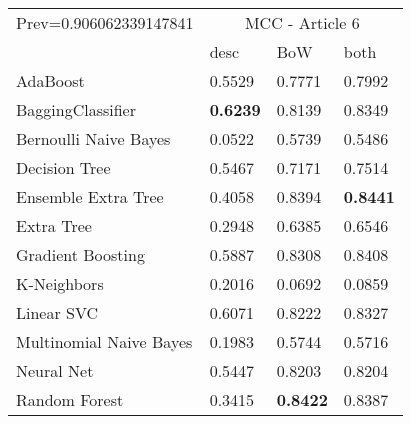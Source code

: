 \begin{tabular}{|l|l|l|l| }
\hline
Prev=0.906062339147841 &  \multicolumn{3}{c|}{MCC - Article 6} \\
\cline{2-4} & desc & BoW & both \\ \hline
AdaBoost                & 0.5529 & 0.7771 & 0.7992\\
BaggingClassifier       & {\bf 0.6239} & 0.8139 & 0.8349\\
Bernoulli Naive Bayes   & 0.0522 & 0.5739 & 0.5486\\
Decision Tree           & 0.5467 & 0.7171 & 0.7514\\
Ensemble Extra Tree     & 0.4058 & 0.8394 & {\bf 0.8441}\\
Extra Tree              & 0.2948 & 0.6385 & 0.6546\\
Gradient Boosting       & 0.5887 & 0.8308 & 0.8408\\
K-Neighbors             & 0.2016 & 0.0692 & 0.0859\\
Linear SVC              & 0.6071 & 0.8222 & 0.8327\\
Multinomial Naive Bayes & 0.1983 & 0.5744 & 0.5716\\
Neural Net              & 0.5447 & 0.8203 & 0.8204\\
Random Forest           & 0.3415 & {\bf 0.8422} & 0.8387\\
\hline
\end{tabular}